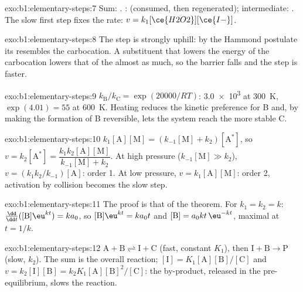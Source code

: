 \begin{solution}{exo:b1:elementary-steps:7}
Sum: . :  (consumed, then
regenerated); intermediate: . The slow first step fixes the
rate: $v = k_1[\ce{H2O2}][\ce{I-}]$.
\end{solution}

\begin{solution}{exo:b1:elementary-steps:8}
The step is strongly uphill: by the Hammond postulate its  resembles the carbocation. A substituent that lowers the energy of
the carbocation lowers that of the  almost as much, so
the barrier falls and the step is faster.
\end{solution}

\begin{solution}{exo:b1:elementary-steps:9}
$k_{\mathrm B}/k_{\mathrm C} = \exp(20000/RT)$: \num{3.0e3} at \qty{300}{K},
$\exp(4.01) = 55$ at \qty{600}{K}. Heating reduces the kinetic preference
for B and, by making the formation of B reversible, lets the system reach
the more stable C.
\end{solution}

\begin{solution}{exo:b1:elementary-steps:10}
$k_1[\mathrm{A}][\mathrm{M}] = (k_{-1}[\mathrm{M}] + k_2)[\mathrm{A}^*]$,
so $v = k_2[\mathrm{A}^*] = \dfrac{k_1k_2[\mathrm{A}][\mathrm{M}]}{k_{-1}[\mathrm{M}]
+ k_2}$. At high pressure ($k_{-1}[\mathrm{M}] \gg k_2$), $v =
(k_1k_2/k_{-1})[\mathrm{A}]$: order 1. At low pressure, $v =
k_1[\mathrm{A}][\mathrm{M}]$: order 2, activation by collision becomes the
slow step.
\end{solution}

\begin{solution}{exo:b1:elementary-steps:11}
The proof is that of the theorem. For $k_1 = k_2 = k$:
$\frac{\dd}{\dd t}([\mathrm{B}]\eu^{kt}) = ka_0$, so $[\mathrm{B}]\eu^{kt} =
ka_0t$ and $[\mathrm{B}] = a_0kt\,\eu^{-kt}$, maximal at $t = 1/k$.
\end{solution}

\begin{solution}{exo:b1:elementary-steps:12}
$\mathrm{A} + \mathrm{B} \rightleftharpoons \mathrm{I} + \mathrm{C}$ (fast,
constant $K_1$), then $\mathrm{I} + \mathrm{B} \to \mathrm{P}$ (slow,
$k_2$). The sum is the overall reaction; $[\mathrm{I}] =
K_1[\mathrm{A}][\mathrm{B}]/[\mathrm{C}]$ and $v = k_2[\mathrm{I}][\mathrm{B}]
= k_2K_1[\mathrm{A}][\mathrm{B}]^2/[\mathrm{C}]$: the by-product, released
in the pre-equilibrium, slows the reaction.
\end{solution}

